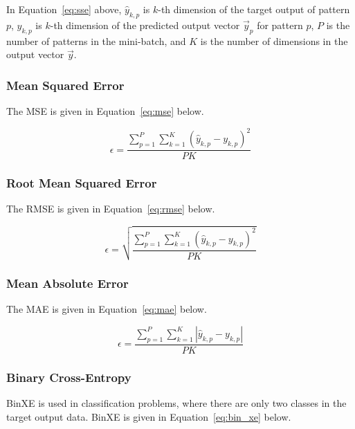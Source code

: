 \noindent
In Equation~\eqref{eq:sse} above, $\hat{y}_{k,p}$ is $k$-th dimension of the target output of pattern $p$, $y_{k,p}$ is $k$-th dimension of the predicted output vector $\vec{y}_{p}$ for pattern $p$, $P$ is the number of patterns in the mini-batch, and $K$ is the number of dimensions in the output vector $\vec{y}$.


\subsubsection{Mean Squared Error}\label{sec:anns:training:error_functions:mse}

The \acs{MSE} is given in Equation~\eqref{eq:mse} below.

\begin{equation}
    \epsilon = \frac{\sum_{p=1}^P \sum_{k=1}^K (\hat{y}_{k,p} - y_{k,p})^2}{PK}
    \label{eq:mse}
\end{equation}


\subsubsection{Root Mean Squared Error}\label{sec:anns:training:error_functions:rmse}

The \acs{RMSE} is given in Equation~\eqref{eq:rmse} below.

\begin{equation}
    \epsilon = \sqrt{\frac{\sum_{p=1}^P \sum_{k=1}^K (\hat{y}_{k,p} - y_{k,p})^2}{PK}}
    \label{eq:rmse}
\end{equation}


\subsubsection{Mean Absolute Error}\label{sec:anns:training:error_functions:mae}

The \acs{MAE} is given in Equation~\eqref{eq:mae} below.

\begin{equation}
    \epsilon = \frac{\sum_{p=1}^P \sum_{k=1}^K |\hat{y}_{k,p} - y_{k,p}|}{PK}
    \label{eq:mae}
\end{equation}


\subsubsection{Binary Cross-Entropy}\label{sec:anns:training:error_functions:bin_xe}

\acs{BinXE} is used in classification problems, where there are only two classes in the target output data. \acs{BinXE} is given in Equation~\eqref{eq:bin_xe} below.

